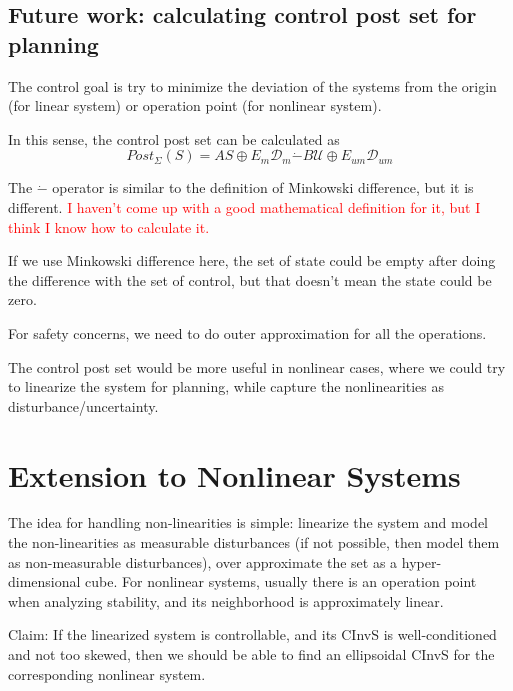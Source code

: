 \documentclass{article}
\begin{document}
\subsection{Future work: calculating control post set for planning}
The control goal is try to minimize the deviation of the systems from the origin (for linear system) or operation point (for nonlinear system).

In this sense, the control post set can be calculated as 
\begin{equation}
Post_{\Sigma}(S) = AS \oplus E_{m} \mathcal D_{m} \dot{-} B \mathcal U \oplus E_{um} \mathcal D_{um}
\label{control-post}
\end{equation}

The $\dot{-}$ operator is similar to the definition of Minkowski difference, but it is different. \textcolor{red}{I haven't come up with a good mathematical definition for it, but I think I know how to calculate it.}

If we use Minkowski difference here, the set of state could be empty after doing the difference with the set of control, but that doesn't mean the state could be zero.

For safety concerns, we need to do outer approximation for all the operations.

The control post set would be more useful in nonlinear cases, where we could try to linearize the system for planning, while capture the nonlinearities as disturbance/uncertainty.

\section{Extension to Nonlinear Systems}
\label{section_nonlinear}

The idea for handling non-linearities is simple: linearize the system and model the non-linearities as measurable disturbances (if not possible, then model them as non-measurable disturbances), over approximate the set as a hyper-dimensional cube. For nonlinear systems, usually there is an operation point when analyzing stability, and its neighborhood is approximately linear.

Claim: If the linearized system is controllable, and its CInvS is well-conditioned and not too skewed, then we should be able to find an ellipsoidal CInvS for the corresponding nonlinear system.
\end{document}
